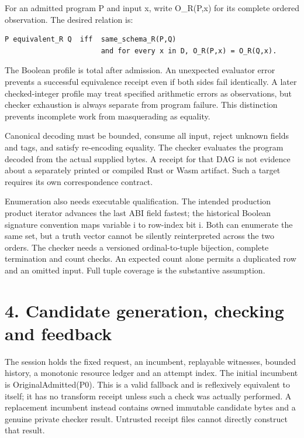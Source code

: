 \documentclass[11pt]{article}
\begin{document}
For an admitted program P and input x, write O\_R(P,x) for its complete ordered observation. The desired relation is:

\begin{small}
\begin{verbatim}
P equivalent_R Q  iff  same_schema_R(P,Q)
                       and for every x in D, O_R(P,x) = O_R(Q,x).
\end{verbatim}
\end{small}

The Boolean profile is total after admission. An unexpected evaluator error prevents a successful equivalence receipt even if both sides fail identically. A later checked-integer profile may treat specified arithmetic errors as observations, but checker exhaustion is always separate from program failure. This distinction prevents incomplete work from masquerading as equality.

Canonical decoding must be bounded, consume all input, reject unknown fields and tags, and satisfy re-encoding equality. The checker evaluates the program decoded from the actual supplied bytes. A receipt for that DAG is not evidence about a separately printed or compiled Rust or Wasm artifact. Such a target requires its own correspondence contract.

Enumeration also needs executable qualification. The intended production product iterator advances the last ABI field fastest; the historical Boolean signature convention maps variable i to row-index bit i. Both can enumerate the same set, but a truth vector cannot be silently reinterpreted across the two orders. The checker needs a versioned ordinal-to-tuple bijection, complete termination and count checks. An expected count alone permits a duplicated row and an omitted input. Full tuple coverage is the substantive assumption.

\section{4. Candidate generation, checking and feedback}

The session holds the fixed request, an incumbent, replayable witnesses, bounded history, a monotonic resource ledger and an attempt index. The initial incumbent is OriginalAdmitted(P0). This is a valid fallback and is reflexively equivalent to itself; it has no transform receipt unless such a check was actually performed. A replacement incumbent instead contains owned immutable candidate bytes and a genuine private checker result. Untrusted receipt files cannot directly construct that result.
\end{document}
